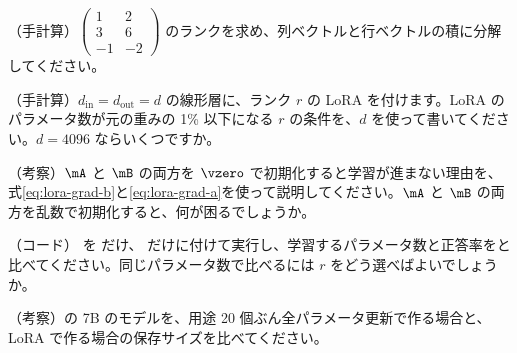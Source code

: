 \begin{exercises}
\item （手計算）$\begin{pmatrix}1&2\\3&6\\-1&-2\end{pmatrix}$ のランクを求め、列ベクトルと行ベクトルの積に分解してください。
\item （手計算）$d_{\text{in}}=d_{\text{out}}=d$ の線形層に、ランク $r$ の LoRA を付けます。LoRA のパラメータ数が元の重みの 1\% 以下になる $r$ の条件を、$d$ を使って書いてください。$d=4096$ ならいくつですか。
\item （考察）$\mA$ と $\mB$ の両方を $\vzero$ で初期化すると学習が進まない理由を、式\eqref{eq:lora-grad-b}と\eqref{eq:lora-grad-a}を使って説明してください。$\mA$ と $\mB$ の両方を乱数で初期化すると、何が困るでしょうか。
\item （コード） を  だけ、 だけに付けて実行し、学習するパラメータ数と正答率をと比べてください。同じパラメータ数で比べるには $r$ をどう選べばよいでしょうか。
\item （考察）の 7B のモデルを、用途 20 個ぶん全パラメータ更新で作る場合と、LoRA で作る場合の保存サイズを比べてください。
\end{exercises}
